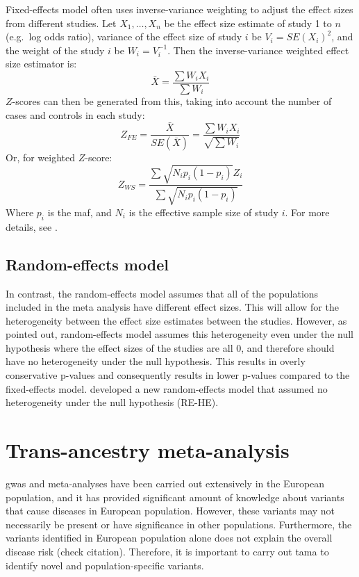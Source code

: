 Fixed-effects model often uses inverse-variance weighting to adjust the effect sizes from different studies.
Let $X_1,\ldots, X_n$ be the effect size estimate of study 1 to $n$ (e.g.\ log odds ratio), variance of the effect size of study $i$ be $V_i = SE(X_i)^2$, and the weight of the study $i$ be $W_i = V_i^{-1}$.
Then the inverse-variance weighted effect size estimator is:
\begin{equation*}
	\bar{X} = \frac{\sum W_iX_i}{\sum W_i}
\end{equation*}
$Z$-scores can then be generated from this, taking into account the number of cases and controls in each study:
\begin{equation*}
	Z_{FE} = \frac{\bar{X}}{SE(\bar{X})} = \frac{\sum W_iX_i}{\sqrt{\sum W_i}}
\end{equation*}
Or, for weighted $Z$-score:
\begin{equation*}
	Z_{WS} = \frac{\sum \sqrt{N_ip_i(1-p_i)}Z_i}{\sum \sqrt{N_ip_i(1-p_i)}}
\end{equation*}
Where $p_i$ is the \gls{maf}, and $N_i$ is the effective sample size of study $i$.
For more details, see \citet{Han2011}.

\subsection{Random-effects model}
\label{sub:random_effects_model}

In contrast, the random-effects model assumes that all of the populations included in the meta analysis have different effect sizes.
This will allow for the heterogeneity between the effect size estimates between the studies.
However, as \citet{Han2011} pointed out, random-effects model assumes this heterogeneity even under the null hypothesis where the effect sizes of the studies are all 0, and therefore should have no heterogeneity under the null hypothesis.
This results in overly conservative p-values and consequently results in lower p-values compared to the fixed-effects model.
\citet{Han2011} developed a new random-effects model that assumed no heterogeneity under the null hypothesis (RE-HE).

\section{Trans-ancestry meta-analysis}
\label{sec:trans_ancestry_meta_analysis}

\gls{gwas} and meta-analyses have been carried out extensively in the European population, and it has provided significant amount of knowledge about variants that cause diseases in European population.
However, these variants may not necessarily be present or have significance in other populations.
Furthermore, the variants identified in European population alone does not explain the overall disease risk (check citation).
Therefore, it is important to carry out \gls{tama} to identify novel and population-specific variants.

